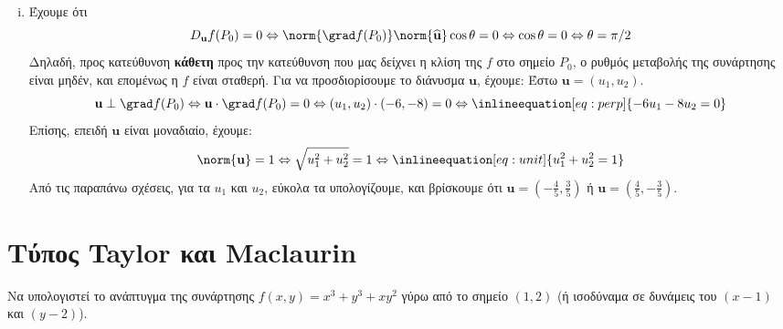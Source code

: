 \begin{solution}
\begin{enumerate}[i)]
    \item Έχουμε ότι 
      \[ 
        D_{\mathbf{u}}f(P_{0}) = 0 \Leftrightarrow \norm{\grad f (P_{0})}
        \norm{\mathbf{\widehat{u}}} \cos{\theta} = 0 \Leftrightarrow 
        \cos{\theta} = 0 \Leftrightarrow \theta = \pi/2 
      \]
      Δηλαδή, προς κατεύθυνση \textbf{κάθετη} προς την κατεύθυνση που μας δείχνει η 
      κλίση της $ f $ στο σημείο $ P_{0} $, ο ρυθμός μεταβολής της συνάρτησης είναι 
      μηδέν, και επομένως η $f$ είναι σταθερή. Για να προσδιορίσουμε το διάνυσμα $
      \mathbf{u} $, έχουμε: Έστω $ \mathbf{u} = (u_{1}, u_{2}) $. 
      \[
        \mathbf{u} \perp \grad f(P_{0}) \Leftrightarrow \mathbf{u} \cdot 
        \grad f (P_{0}) = 0 \Leftrightarrow (u_1,u_{2}) \cdot (-6,-8) =
        0 \Leftrightarrow \inlineequation[eq:perp]{-6u_{1}-8u_{2}=0}
      \]
      Επίσης, επειδή $ \mathbf{u} $ είναι μοναδιαίο, έχουμε: 
      \[
        \norm{\mathbf{u}} =1 \Leftrightarrow \sqrt{u_{1}^{2}+u_{2}^{2}} = 1
        \Leftrightarrow \inlineequation[eq:unit]{u_{1}^{2}+u_{2}^{2}=1}
      \] 
      Από τις παραπάνω σχέσεις, για τα $ u_{1} $ και $ u_{2} $, εύκολα τα υπολογίζουμε,
      και βρίσκουμε ότι $ \mathbf{u} = \left(- \frac{4}{5}
      , \frac{3}{5}\right) $ ή $ \mathbf{u} = 
      \left( \frac{4}{5} , - \frac{3}{5}\right) $. 
  \end{enumerate}
\end{solution}


\section{Τύπος Taylor και Maclaurin}

\begin{example}
  Να υπολογιστεί το ανάπτυγμα της συνάρτησης $f(x,y)=x^3+y^3+xy^2$ γύρω από το 
  σημείο $ (1,2) $ (ή ισοδύναμα σε δυνάμεις του $(x-1)$ και $(y-2)$).
\end{example}

